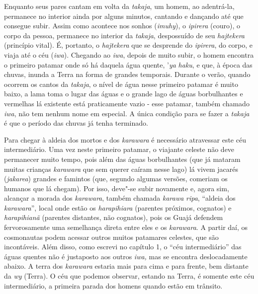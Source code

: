 Enquanto seus pares cantam em volta da \emph{takaja}, um homem, ao
adentrá-la, permanece no interior ainda por alguns minutos, cantando e
dançando até que consegue subir. Assim como acontece nos sonhos
(\emph{imuhy}), o \emph{ipirera} (couro), o corpo da pessoa, permanece
no interior da \emph{takaja}, despossuído de seu \emph{hajtekera}
(princípio vital). É, portanto, o \emph{hajtekera} que se desprende do
\emph{ipirera}, do corpo, e viaja até o céu (\emph{iwa}). Chegando ao
\emph{iwa}, depois de muito subir, o homem encontra o primeiro patamar
onde só há daquela água quente, '\emph{ya} \emph{haku}, e que, à época
das chuvas, inunda a Terra na forma de grandes temporais. Durante o
verão, quando ocorrem os cantos da \emph{takaja}, o nível de água nesse
primeiro patamar é muito baixo, a lama toma o lugar das águas e o grande
lago de águas borbulhantes e vermelhas lá existente está praticamente
vazio - esse patamar, também chamado \emph{iwa}, não tem nenhum nome em
especial. A única condição para se fazer a \emph{takaja} é que o período
das chuvas já tenha terminado.

Para chegar à aldeia dos mortos e dos \emph{karawara} é necessário
atravessar este céu intermediário. Uma vez neste primeiro patamar, o
viajante celeste não deve permanecer muito tempo, pois além das águas
borbulhantes (que já mataram muitas crianças \emph{karawara} que sem
querer caíram nesse lago) lá vivem jacarés (\emph{jakarea}) grandes e
famintos (que, segundo algumas versões, comeriam os humanos que lá
chegam). Por isso, deve"-se subir novamente e, agora sim, alcançar a
morada dos \emph{karawara}, também chamada \emph{karawa} \emph{ripa},
``aldeia dos \emph{karawara}'', local onde estão os \emph{harapihiara}
(parentes próximos, cognatos) e \emph{harapihianã} (parentes distantes,
não cognatos), pois os Guajá defendem fervorosamente uma semelhança
direta entre eles e os \emph{karawara}. A partir daí, os cosmonautas
podem acessar outros muitos patamares celestes, que são incontáveis.
Além disso, como escrevi no capítulo 1, o ``céu intermediário'' das águas
quentes não é justaposto aos outros \emph{iwa,} mas se encontra
deslocadamente abaixo. A terra dos \emph{karawara} estaria mais para
cima e para frente, bem distante da \emph{wy} (Terra). O céu que podemos
observar, estando na Terra, é somente este céu intermediário, a primeira
parada dos homens quando estão em trânsito.

